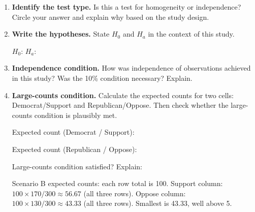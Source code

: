 \documentclass[10pt]{article}
\begin{document}
\begin{enumerate}[label=\textbf{B\arabic*.}]

    \item \textbf{Identify the test type.} Is this a test for homogeneity or independence?
          Circle your answer and explain why based on the study design.


    \item \textbf{Write the hypotheses.} State $H_0$ and $H_a$ in the context of this study.

          $H_0$: 
          $H_a$: 

    \item \textbf{Independence condition.} How was independence of observations achieved
          in this study? Was the 10\% condition necessary? Explain.


    \item \textbf{Large-counts condition.} Calculate the expected counts for two cells:
          Democrat/Support and Republican/Oppose. Then check whether the large-counts
          condition is plausibly met.

          Expected count (Democrat / Support): 

          Expected count (Republican / Oppose): 

          Large-counts condition satisfied?  \quad Explain: 

          \begin{teachernote}
              Scenario B expected counts: each row total is 100.
              Support column: $100 \times 170/300 \approx 56.67$ (all three rows).
              Oppose column: $100 \times 130/300 \approx 43.33$ (all three rows).
              Smallest is 43.33, well above 5.
          \end{teachernote}

\end{enumerate}
\end{document}
